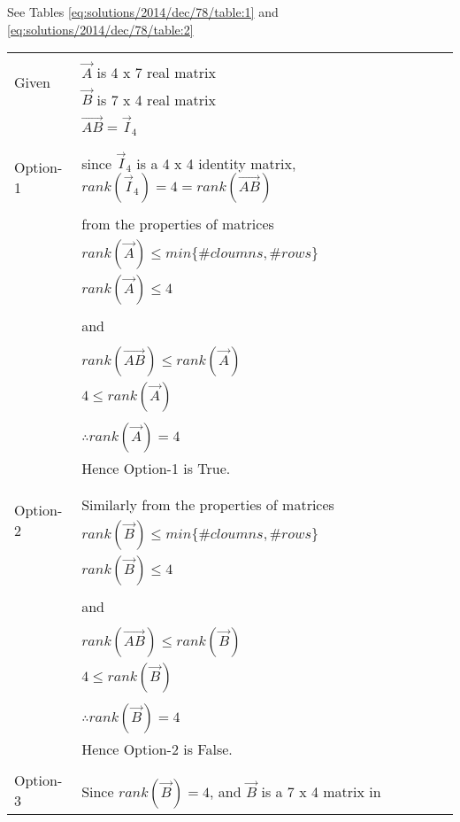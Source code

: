 See Tables \ref{eq:solutions/2014/dec/78/table:1}
and \ref{eq:solutions/2014/dec/78/table:2}

\onecolumn
\begin{longtable}{|l|l|}
\hline
\multirow{3}{*}{Given} & \\
& $\vec{A}$ is 4 x 7 real matrix\\
& $\vec{B}$ is 7 x 4 real matrix\\
& $\vec{AB} =\vec{I}_4 $\\
&\\
\hline
\multirow{3}{*}{Option-1} & \\
& since $\vec{I}_4$ is a 4 x 4 identity matrix, $rank(\vec{I}_4) = 4 = rank(\vec{AB})$\\
& \\
& from the properties of matrices\\
& $rank(\vec{A}) \leq min\lbrace \# cloumns, \#rows \rbrace$\\
& $rank(\vec{A}) \leq 4$\\
& \\
& and\\
& \\
& $rank(\vec{AB}) \leq rank(\vec{A})$\\
& $ 4 \leq rank(\vec{A})$\\
& \\
& $\therefore rank(\vec{A}) = 4$\\
& Hence Option-1 is True. \\
& \\
\hline
\multirow{3}{*}{Option-2} & \\
& Similarly from the properties of matrices\\
& $rank(\vec{B}) \leq min\lbrace \# cloumns, \#rows \rbrace$\\
& $rank(\vec{B}) \leq 4$\\
& \\
& and\\
& \\
& $rank(\vec{AB}) \leq rank(\vec{B})$\\
& $ 4 \leq rank(\vec{B})$\\
& \\
& $\therefore rank(\vec{B}) = 4$\\
& Hence Option-2 is False. \\
& \\
\hline
\multirow{3}{*}{Option-3} & \\
& Since $rank(\vec{B}) = 4$, and $\vec{B}$ is a 7 x 4 matrix in \\

\end{longtable}
